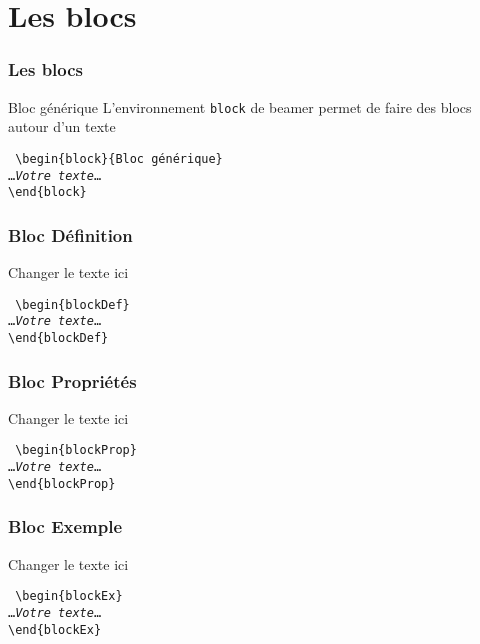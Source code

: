 \documentclass[aspectratio=169]{beamer}
\begin{document}
\section{Les blocs}
\begin{frame}
\frametitle{Les \og blocs\fg}
\begin{block}{Bloc générique}
L'environnement \texttt{block} de beamer permet de faire des blocs
autour d'un texte
\end{block}
\noindent\texttt{%
\textbackslash begin\{block\}\{Bloc générique\}\\
\ldots\emph{Votre texte}\ldots\\
\textbackslash end\{block\}
}%
\end{frame}
\begin{frame}
\frametitle{Bloc \og Définition\fg}
\begin{blockDef}
Changer le texte ici
\end{blockDef}
\noindent\texttt{%
\textbackslash begin\{blockDef\}\\
\ldots\emph{Votre texte}\ldots\\
\textbackslash end\{blockDef\}
}%
\end{frame}
\begin{frame}
    \frametitle{Bloc \og Propriétés\fg}
    \begin{blockProp}
        Changer le texte ici
    \end{blockProp}
\noindent\texttt{%
\textbackslash begin\{blockProp\}\\
\ldots\emph{Votre texte}\ldots\\
\textbackslash end\{blockProp\}
}%
\end{frame}
\begin{frame}
\frametitle{Bloc \og Exemple\fg}
\begin{blockEx}
Changer le texte ici
\end{blockEx}
\noindent\texttt{%
\textbackslash begin\{blockEx\}\\
\ldots\emph{Votre texte}\ldots\\
\textbackslash end\{blockEx\}
}%
\end{frame}
\end{document}
